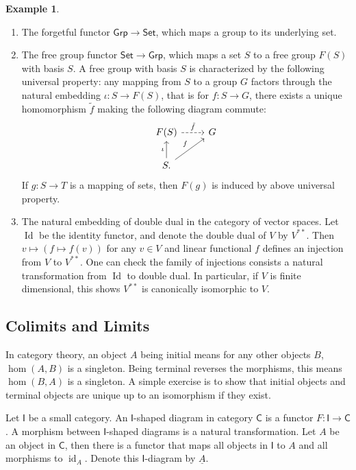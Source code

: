 \documentclass[a4paper]{amsart}
\theoremstyle{plain}
\theoremstyle{definition}
\newtheorem{eg}[thm]{Example}
\theoremstyle{remark}
\begin{document}
\begin{eg}
    \begin{enumerate}
        \item The forgetful functor $\mathsf{Grp}\to\mathsf{Set}$, which maps a group to its underlying set.
        \item The free group functor $\mathsf{Set}\to\mathsf{Grp}$, which maps a set $S$ to a free group $F(S)$ with basis $S$.
        A free group with basis $S$ is characterized by the following universal property:
        any mapping from $S$ to a group $G$ factors through the natural embedding $\iota:S\to F(S)$, that is for $f:S\to G$, there exists a unique homomorphism $\tilde{f}$ making the following diagram commute:
        \[\begin{tikzcd}
            F(S) \ar[r, dashed, "\tilde{f}"] & G \\
            S \ar[u, "\iota"] \ar[ur, "f"].
        \end{tikzcd}\]
        If $g:S\to T$ is a mapping of sets, then $F(g)$ is induced by above universal property.
        \item The natural embedding of double dual in the category of vector spaces.
        Let $\operatorname{Id}$ be the identity functor, and denote the double dual of $V$ by $V^{**}$.
        Then $v\mapsto(f\mapsto f(v))$ for any $v\in V$ and linear functional $f$ defines an injection from $V$ to $V^{**}$.
        One can check the family of injections consists a natural transformation from $\operatorname{Id}$ to double dual.
        In particular, if $V$ is finite dimensional, this shows $V^{**}$ is canonically isomorphic to $V$.
    \end{enumerate}
\end{eg}

\subsection{Colimits and Limits}
In category theory, an object $A$ being initial means for any other objects $B$, $\hom(A,B)$ is a singleton.
Being terminal reverses the morphisms, this means $\hom(B,A)$ is a singleton.
A simple exercise is to show that initial objects and terminal objects are unique up to an isomorphism if they exist.

Let $\mathsf{I}$ be a small category.
An $\mathsf{I}$-shaped diagram in category $\mathsf{C}$ is a functor $F:\mathsf{I}\to\mathsf{C}$.
A morphism between $\mathsf{I}$-shaped diagrams is a natural transformation.
Let $A$ be an object in $\mathsf{C}$, then there is a functor that maps all objects in $\mathsf{I}$ to $A$ and all morphisms to $\operatorname{id}_A$.
Denote this $\mathsf{I}$-diagram by $\underline{A}$.
\end{document}
